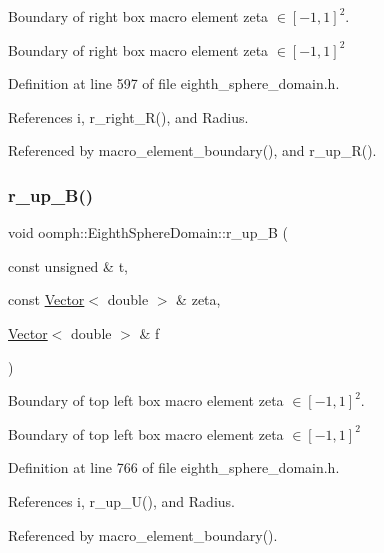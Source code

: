 Boundary of right box macro element zeta $ \in [-1,1]^2 $. 

Boundary of right box macro element zeta $ \in [-1,1]^2 $ 

Definition at line 597 of file eighth\+\_\+sphere\+\_\+domain.\+h.



References i, r\+\_\+right\+\_\+\+R(), and Radius.



Referenced by macro\+\_\+element\+\_\+boundary(), and r\+\_\+up\+\_\+\+R().

\mbox{\label{classoomph_1_1EighthSphereDomain_aaac560ab6bbe35010c1ff61a466d1252}} 
\subsubsection{\texorpdfstring{r\+\_\+up\+\_\+\+B()}{r\_up\_B()}}
{\footnotesize\ttfamily void oomph\+::\+Eighth\+Sphere\+Domain\+::r\+\_\+up\+\_\+B (\begin{DoxyParamCaption}\item[{const unsigned \&}]{t,  }\item[{const \hyperlink{classoomph_1_1Vector}{Vector}$<$ double $>$ \&}]{zeta,  }\item[{\hyperlink{classoomph_1_1Vector}{Vector}$<$ double $>$ \&}]{f }\end{DoxyParamCaption})\hspace{0.3cm}{\ttfamily [private]}}



Boundary of top left box macro element zeta $ \in [-1,1]^2 $. 

Boundary of top left box macro element zeta $ \in [-1,1]^2 $ 

Definition at line 766 of file eighth\+\_\+sphere\+\_\+domain.\+h.



References i, r\+\_\+up\+\_\+\+U(), and Radius.



Referenced by macro\+\_\+element\+\_\+boundary().

\mbox{\label{classoomph_1_1EighthSphereDomain_ad55bde69a74b24f1c9c6cc6bb277e39b}} 
